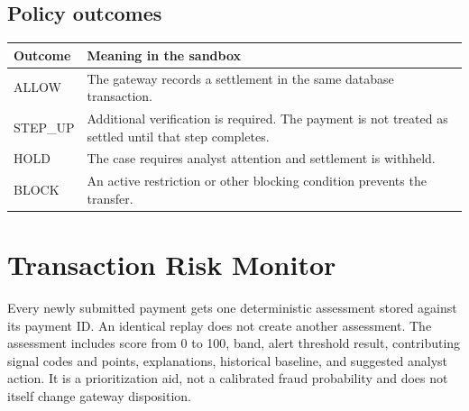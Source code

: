\documentclass[11pt,a4paper]{article}
\begin{document}
\subsection{Policy outcomes}
\begin{tabularx}{\linewidth}{@{}lX@{}}
\toprule
Outcome & Meaning in the sandbox \\
\midrule
ALLOW & The gateway records a settlement in the same database transaction. \\
STEP\_UP & Additional verification is required. The payment is not treated as settled until that step completes. \\
HOLD & The case requires analyst attention and settlement is withheld. \\
BLOCK & An active restriction or other blocking condition prevents the transfer. \\
\bottomrule
\end{tabularx}

\section{Transaction Risk Monitor}
Every newly submitted payment gets one deterministic assessment stored against its payment ID. An identical replay does not create another assessment. The assessment includes score from 0 to 100, band, alert threshold result, contributing signal codes and points, explanations, historical baseline, and suggested analyst action. It is a prioritization aid, not a calibrated fraud probability and does not itself change gateway disposition.
\end{document}
